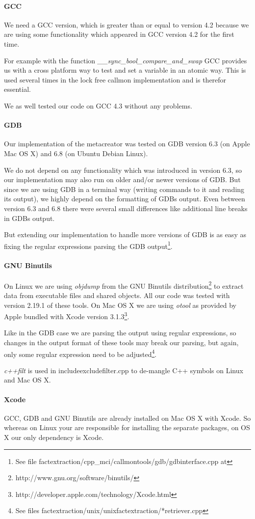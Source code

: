 \paragraph{GCC} We need a GCC version, which is greater than or equal to version 4.2 because we are using some functionality which appeared in GCC version 4.2 for the first time.

For example with the function \emph{\_\_sync\_bool\_compare\_and\_swap} GCC provides us with a cross platform way to test and set a variable in an atomic way. This is used several times in the lock free callmon implementation and is therefor essential.

We as well tested our code on GCC 4.3 without any problems.

\paragraph{GDB}

Our implementation of the metacreator was tested on GDB version 6.3 (on Apple Mac OS X) and 6.8 (on Ubuntu Debian Linux).

We do not depend on any functionality which was introduced in version 6.3, so our implementation may also run on older and/or newer versions of GDB. But since we are using GDB in a terminal way (writing commands to it and reading its output), we highly depend on the formatting of GDBs output. Even between version 6.3 and 6.8 there were several small differences like additional line breaks in GDBs output.

But extending our implementation to handle more versions of GDB is as easy as fixing the regular expressions parsing the GDB output\footnote{See file factextraction/cpp\_mci/callmontools/gdb/gdbinterface.cpp at }.

\paragraph{GNU Binutils}

On Linux we are using \emph{objdump} from the GNU Binutils distribution\footnote{http://www.gnu.org/software/binutils/} to extract data from executable files and shared objects.
All our code was tested with version 2.19.1 of these tools.  On Mac OS X we are using \emph{otool} as provided by Apple bundled with Xcode version 3.1.3\footnote{http://developer.apple.com/technology/Xcode.html}.

Like in the GDB case we are parsing the output using regular expressions, so changes in the output format of these tools may break our parsing, but again, only some regular expression need to be adjusted\footnote{See files factextraction/unix/unixfactextraction/*retriever.cpp}.

\emph{c++filt} is used in includeexcludefilter.cpp to de-mangle C++ symbols on Linux and Mac OS X.

\paragraph{Xcode} GCC, GDB and GNU Binutils are already installed on Mac OS X with Xcode.  So whereas on Linux your are responsible for installing the separate packages, on OS X our only dependency is Xcode.
